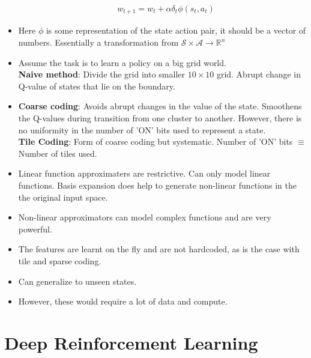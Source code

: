 \documentclass[a4paper]{article}
\begin{document}
\begin{itemize}
\begin{equation*}
\begin{split}
            &w_{t+1}=w_t+\alpha \delta_t\phi(s_t,a_t)
        \end{split}
    \end{equation*}
    \item Here $\phi$ is some representation of the state action pair, it should be a vector of numbers. Essentially a transformation from $\mathcal{S}\times \mathcal{A}\to \mathbb{R}^n$
    \item Assume the task is to learn a policy on a big grid world.\\
    \textbf{Naive method}: Divide the grid into smaller $10\times 10$ grid. Abrupt change in Q-value of states that lie on the boundary.\\
    \item \textbf{Coarse coding}: Avoids abrupt changes in the value of the state. Smoothens the Q-values during transition from one cluster to another. However, there is no uniformity in the number of 'ON' bits used to represent a state.\\
    \textbf{Tile Coding}: Form of coarse coding but systematic. Number of 'ON' bits $\equiv$ Number of tiles used.
    \item Linear function approximaters are restrictive. Can only model linear functions. Basis expansion does help to generate non-linear functions in the the original input space.
    \item Non-linear approximators can model complex functions and are very powerful.
    \item The features are learnt on the fly and are not hardcoded, as is the case with tile and sparse coding.
    \item Can generalize to unseen states.
    \item However, these would require a lot of data and compute.
\end{itemize}

\section{Deep Reinforcement Learning}
\end{document}

